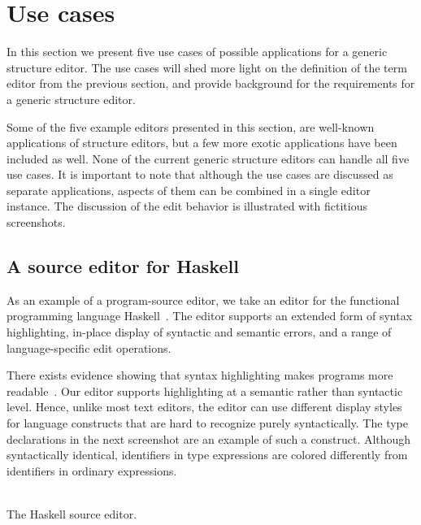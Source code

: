 \documentclass{speauth}
\begin{document}
\newcommand{\editStepScrshotSz}[5]{%
\editStepScrshot{\parbox{#1}{#2}}{\parbox{#1}{#3}}{#4}{#5}
}


\section{Use cases} 
\label{usecases}

In this section we present five use cases of possible applications for a generic structure editor. The use cases will shed more light on the definition of the term editor from the previous section, and provide background for the requirements for a generic structure editor. 

Some of the five example editors presented in this section, are well-known applications of structure editors, but a few more exotic applications have been included as well. None of the current generic structure editors can handle all five use cases. It is important to note that although the use cases are discussed as separate applications, aspects of them can be combined in a single editor instance.
The discussion of the edit behavior is illustrated with fictitious screenshots. %

\subsection{A source editor for Haskell}  
\label{sect:sourceeditor} 
As an example of a program-source editor, we take an editor for the functional programming language Haskell~\cite{peytonJones03haskell}. The editor supports an extended form of syntax highlighting, in-place display of syntactic and semantic errors, and a range of language-specific edit operations. 

There exists evidence showing that syntax highlighting makes programs more readable~\cite{baecker88readability,omanCook90typography}. Our editor supports highlighting at a semantic rather than syntactic level. Hence, unlike most text editors, the editor can use different display styles for language constructs that are hard to recognize purely syntactically. The type declarations in the next screenshot are an example of such a construct. Although syntactically identical, identifiers in type expressions are colored differently from identifiers in ordinary expressions.

\begin{center}
\\ [3mm]
{\sf The Haskell source editor.}
\end{center}
\end{document}
